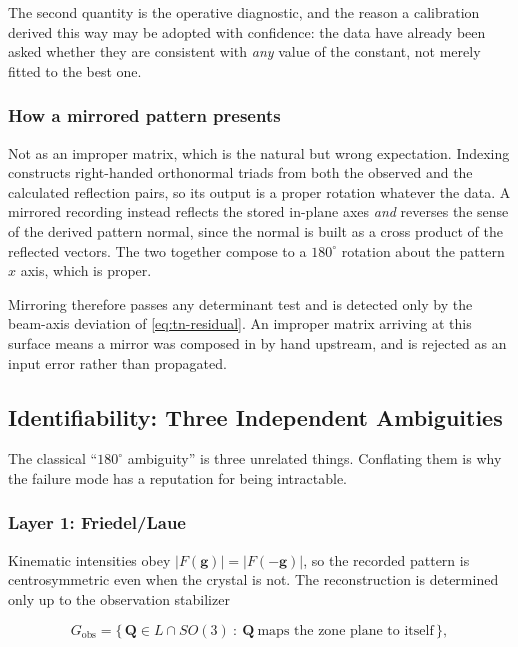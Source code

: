 The second quantity is the operative diagnostic, and the reason a calibration derived this way may
be adopted with confidence: the data have already been asked whether they are consistent with
\emph{any} value of the constant, not merely fitted to the best one.

\subsubsection{How a mirrored pattern presents}

Not as an improper matrix, which is the natural but wrong expectation. Indexing constructs
right-handed orthonormal triads from both the observed and the calculated reflection pairs, so its
output is a proper rotation whatever the data. A mirrored recording instead reflects the stored
in-plane axes \emph{and} reverses the sense of the derived pattern normal, since the normal is
built as a cross product of the reflected vectors. The two together compose to a $180^{\circ}$
rotation about the pattern $x$ axis, which is proper.

Mirroring therefore passes any determinant test and is detected only by the beam-axis deviation of
\eqref{eq:tn-residual}. An improper matrix arriving at this surface means a mirror was composed in
by hand upstream, and is rejected as an input error rather than propagated.

\subsection{Identifiability: Three Independent Ambiguities}

The classical ``$180^{\circ}$ ambiguity'' is three unrelated things. Conflating them is why the
failure mode has a reputation for being intractable.

\subsubsection{Layer 1: Friedel/Laue}

Kinematic intensities obey $\lvert F(\mathbf{g})\rvert = \lvert F(-\mathbf{g})\rvert$, so the
recorded pattern is centrosymmetric even when the crystal is not. The reconstruction is determined
only up to the observation stabilizer

\begin{equation}
G_{\text{obs}} = \bigl\{\, \mathbf{Q} \in L \cap SO(3)\ :\ \mathbf{Q}\ \text{maps the zone plane to itself} \,\bigr\},
\label{eq:tn-stabilizer}
\end{equation}

